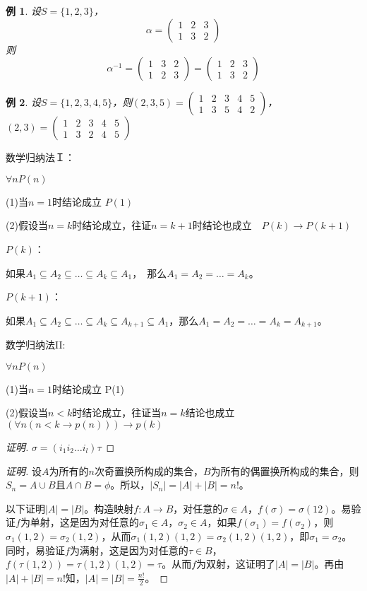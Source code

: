 \documentclass{article}
\newtheorem*{Example}{例}
\begin{document}
\begin{CJK*}{UTF8}{gbsn}
  
  \begin{Example}
    设$S=\{1,2,3\}$，
    \[\alpha=\begin{pmatrix}1&2&3\\1&3&2\end{pmatrix}\]
    则
    \[\alpha^{-1}=\begin{pmatrix}1&3&2\\1&2&3\end{pmatrix}=\begin{pmatrix}1&2&3\\1&3&2\end{pmatrix}\]    
  \end{Example}
      
      
         \begin{Example}
   设$S=\{1,2,3,4,5\}$，则$(2,3,5)=\begin{pmatrix}1&2&3&4&5\\1&3&5&4&2\end{pmatrix}$，$(2,3)=\begin{pmatrix}1&2&3&4&5\\1&3&2&4&5\end{pmatrix}$     
   \end{Example}

   数学归纳法Ｉ：

   $\forall n P(n)$

   (1)当$n=1$时结论成立 $P(1)$

   (2)假设当$n=k$时结论成立，往证$n=k+1$时结论也成立　$P(k)\to P(k+1)$


   $P(k)$：
   
   如果$A_1\subseteq A_2\subseteq \ldots \subseteq A_{k} \subseteq A_1$，　那么$A_1 = A_2 = \ldots = A_k$。

   $P(k+1)$：

   如果$A_1\subseteq A_2\subseteq \ldots \subseteq A_{k} \subseteq A_{k+1} \subseteq A_1$，那么$A_1=A_2=\ldots = A_k = A_{k+1}$。

   
   数学归纳法II:

   $\forall n P(n)$

   (1)当$n=1$时结论成立 P(1)

   (2)假设当$n<k$时结论成立，往证当$n=k$结论也成立　$(\forall n (n<k\to p(n))) \to p(k)$ 

   \begin{proof}[证明]
     $\sigma = (i_1i_2\ldots i_l)\tau$
   \end{proof}

   \begin{proof}[证明]
     设$A$为所有的$n$次奇置换所构成的集合，$B$为所有的偶置换所构成的集合，则$S_n=A\cup B$且$A\cap B=\phi$。所以，$|S_n|=|A| + |B|=n!$。

     以下证明$|A|=|B|$。构造映射$f:A\to B$，对任意的$\sigma\in A$，$f(\sigma) = \sigma(12)$。易验证$f$为单射，这是因为对任意的$\sigma_1\in A$，$\sigma_2\in A$，如果$f(\sigma_1)=f(\sigma_2)$，则$\sigma_1(1,2)=\sigma_2(1,2)$，从而$\sigma_1(1,2)(1,2)=\sigma_2(1,2)(1,2)$，即$\sigma_1=\sigma_2$。同时，易验证$f$为满射，这是因为对任意的$\tau \in B$，$f(\tau(1,2))=\tau(1,2)(1,2)=\tau$。从而$f$为双射，这证明了$|A|=|B|$。再由$|A|+|B|=n!$知，$|A|=|B|=\frac{n!}{2}$。
   \end{proof}
\end{CJK*}
\end{document}
